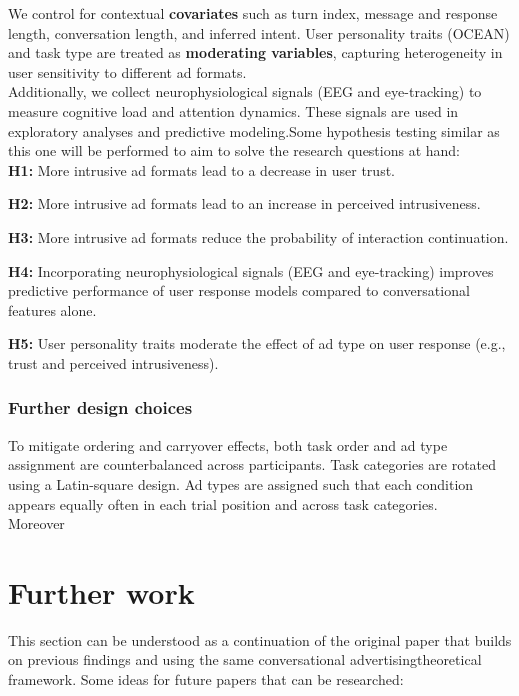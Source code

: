 \documentclass{article}
\begin{document}
We control for contextual \textbf{covariates} such as turn index, message and response length, conversation length, and inferred intent. User personality traits (OCEAN) and task type are treated as \textbf{moderating variables}, capturing heterogeneity in user sensitivity to different ad formats.
\\

Additionally, we collect neurophysiological signals (EEG and eye-tracking) to measure cognitive load and attention dynamics. These signals are used in exploratory analyses and predictive modeling.Some hypothesis testing similar as this one will be performed to aim to solve the research questions at hand:
\\

\textbf{H1:} More intrusive ad formats lead to a decrease in user trust.

\textbf{H2:} More intrusive ad formats lead to an increase in perceived intrusiveness.

\textbf{H3:} More intrusive ad formats reduce the probability of interaction continuation.

\textbf{H4:} Incorporating neurophysiological signals (EEG and eye-tracking) improves predictive performance of user response models compared to conversational features alone.

\textbf{H5:} User personality traits moderate the effect of ad type on user response (e.g., trust and perceived intrusiveness).

\subsubsection{Further design choices}

To mitigate ordering and carryover effects, both task order and ad type assignment are counterbalanced across participants. Task categories are rotated using a Latin-square design. Ad types are assigned such that each condition appears equally often in each trial position and across task categories.
\\

Moreover

\newpage

\section{Further work}

This section can be understood as a continuation of the original paper that builds on previous findings and using the same conversational advertisingtheoretical framework. Some ideas for future papers that can be researched:
\end{document}
